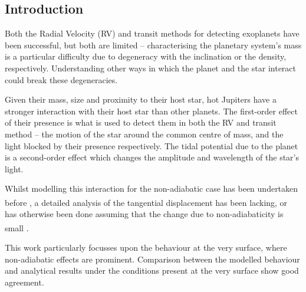 \documentclass[a0,portrait]{a0poster}
\begin{document}
\begin{multicols}{2}
\begin{tcolorbox}[colframe=black,colback=blue!10!white]
\vspace{0.5cm}

\section*{Introduction}

Both the Radial Velocity (RV) and transit methods for detecting exoplanets have been successful, but both are limited -- characterising the planetary system's mass is a particular difficulty due to degeneracy with the inclination or the density, respectively. Understanding other ways in which the planet and the star interact could break these degeneracies.

Given their mass, size and proximity to their host star, hot Jupiters have a stronger interaction with their host star than other planets. The first-order effect of their presence is what is used to detect them in both the RV and transit method -- the motion of the star around the common centre of mass, and the light blocked by their presence respectively. The tidal potential due to the planet is a second-order effect which changes the amplitude and wavelength of the star's light.

Whilst modelling this interaction for the non-adiabatic case has been undertaken before \textsuperscript{\cite{Pfahl2008}}, a detailed analysis of the tangential displacement has been lacking, or has otherwise been done assuming that the change due to non-adiabaticity is small \textsuperscript{\cite{Terquem1998}}.

This work particularly focusses upon the behaviour at the very surface, where non-adiabatic effects are prominent. Comparison between the modelled behaviour and analytical results under the conditions present at the very surface show good agreement.

\vspace{0.5cm}

\end{tcolorbox}



\color{DarkSlateGray} %

\begin{tcolorbox}[colframe=black,colback=blue!10!white]

\vspace{0.5cm}


\end{tcolorbox}
\end{multicols}
\end{document}
